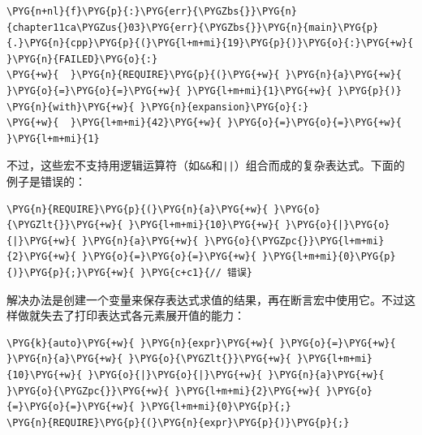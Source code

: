 \begin{codeblockbg}
\begin{Verbatim}[commandchars=\\\{\},breaklines=true,breakanywhere=true,fontsize=\codefont,xleftmargin=17bp]
\PYG{n+nl}{f}\PYG{p}{:}\PYG{err}{\PYGZbs{}}\PYG{n}{chapter11ca\PYGZus{}03}\PYG{err}{\PYGZbs{}}\PYG{n}{main}\PYG{p}{.}\PYG{n}{cpp}\PYG{p}{(}\PYG{l+m+mi}{19}\PYG{p}{)}\PYG{o}{:}\PYG{+w}{ }\PYG{n}{FAILED}\PYG{o}{:}
\PYG{+w}{  }\PYG{n}{REQUIRE}\PYG{p}{(}\PYG{+w}{ }\PYG{n}{a}\PYG{+w}{ }\PYG{o}{=}\PYG{o}{=}\PYG{+w}{ }\PYG{l+m+mi}{1}\PYG{+w}{ }\PYG{p}{)}
\PYG{n}{with}\PYG{+w}{ }\PYG{n}{expansion}\PYG{o}{:}
\PYG{+w}{  }\PYG{l+m+mi}{42}\PYG{+w}{ }\PYG{o}{=}\PYG{o}{=}\PYG{+w}{ }\PYG{l+m+mi}{1}
\end{Verbatim}
\end{codeblockbg}



不过，这些宏不支持用逻辑运算符（如\texttt{\&\&}和\texttt{||}）组合而成的复杂表达式。下面的例子是错误的：



\begin{codeblockbg}
\begin{Verbatim}[commandchars=\\\{\},breaklines=true,breakanywhere=true,fontsize=\codefont,xleftmargin=17bp]
\PYG{n}{REQUIRE}\PYG{p}{(}\PYG{n}{a}\PYG{+w}{ }\PYG{o}{\PYGZlt{}}\PYG{+w}{ }\PYG{l+m+mi}{10}\PYG{+w}{ }\PYG{o}{|}\PYG{o}{|}\PYG{+w}{ }\PYG{n}{a}\PYG{+w}{ }\PYG{o}{\PYGZpc{}}\PYG{l+m+mi}{2}\PYG{+w}{ }\PYG{o}{=}\PYG{o}{=}\PYG{+w}{ }\PYG{l+m+mi}{0}\PYG{p}{)}\PYG{p}{;}\PYG{+w}{ }\PYG{c+c1}{// 错误}
\end{Verbatim}
\end{codeblockbg}



解决办法是创建一个变量来保存表达式求值的结果，再在断言宏中使用它。不过这样做就失去了打印表达式各元素展开值的能力：



\begin{codeblockbg}
\begin{Verbatim}[commandchars=\\\{\},breaklines=true,breakanywhere=true,fontsize=\codefont,xleftmargin=17bp]
\PYG{k}{auto}\PYG{+w}{ }\PYG{n}{expr}\PYG{+w}{ }\PYG{o}{=}\PYG{+w}{ }\PYG{n}{a}\PYG{+w}{ }\PYG{o}{\PYGZlt{}}\PYG{+w}{ }\PYG{l+m+mi}{10}\PYG{+w}{ }\PYG{o}{|}\PYG{o}{|}\PYG{+w}{ }\PYG{n}{a}\PYG{+w}{ }\PYG{o}{\PYGZpc{}}\PYG{+w}{ }\PYG{l+m+mi}{2}\PYG{+w}{ }\PYG{o}{=}\PYG{o}{=}\PYG{+w}{ }\PYG{l+m+mi}{0}\PYG{p}{;}
\PYG{n}{REQUIRE}\PYG{p}{(}\PYG{n}{expr}\PYG{p}{)}\PYG{p}{;}
\end{Verbatim}
\end{codeblockbg}


